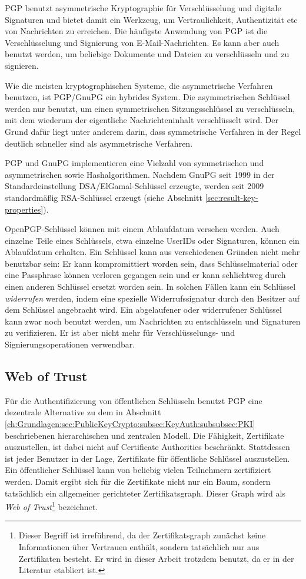 PGP benutzt asymmetrische Kryptographie für Verschlüsselung und
digitale Signaturen und bietet damit ein Werkzeug, um Vertraulichkeit,
Authentizität etc von Nachrichten zu erreichen. Die häufigste
Anwendung von PGP ist die Verschlüsselung und Signierung von
E-Mail-Nachrichten. Es kann aber auch benutzt werden, um beliebige
Dokumente und Dateien zu verschlüsseln und zu signieren.

Wie die meisten kryptographischen Systeme, die asymmetrische Verfahren
benutzen, ist PGP/GnuPG ein hybrides System. Die asymmetrischen
Schlüssel werden nur benutzt, um einen symmetrischen
Sitzungsschlüssel zu verschlüsseln, mit dem wiederum der
eigentliche Nachrichteninhalt verschlüsselt wird. Der Grund dafür
liegt unter anderem darin, dass symmetrische Verfahren in der Regel
deutlich schneller sind als asymmetrische Verfahren.

PGP und GnuPG implementieren eine Vielzahl von symmetrischen und
asymmetrischen sowie Hashalgorithmen. Nachdem GnuPG seit 1999 in der
Standardeinstellung DSA/ElGamal-Schlüssel erzeugte, werden seit 2009
standardmäßig RSA-Schlüssel erzeugt (siehe Abschnitt
\ref{sec:result-key-properties}).

OpenPGP-Schlüssel können mit einem Ablaufdatum versehen
werden. Auch einzelne Teile eines Schlüssels, etwa einzelne UserIDs
oder Signaturen, können ein Ablaufdatum erhalten. Ein Schlüssel
kann aus verschiedenen Gründen nicht mehr benutzbar sein: Er kann
kompromittiert worden sein, dass Schlüsselmaterial oder eine
Passphrase können verloren gegangen sein und er kann schlichtweg
durch einen anderen Schlüssel ersetzt worden sein. In solchen
Fällen kann ein Schlüssel \emph{widerrufen} werden, indem eine
spezielle Widerrufssignatur durch den Besitzer auf dem Schlüssel
angebracht wird. Ein abgelaufener oder widerrufener Schlüssel kann
zwar noch benutzt werden, um Nachrichten zu entschlüsseln und
Signaturen zu verifizieren. Er ist aber nicht mehr für
Verschlüsselungs- und Signierungsoperationen verwendbar.

\subsection{Web of Trust}
\label{ch:Grundlagen:sec:PublicKeyCrypto:subsec:KeyAuth:subsubsec:WOT}

Für die Authentifizierung von öffentlichen Schlüsseln benutzt
PGP eine dezentrale Alternative zu dem in Abschnitt
\ref{ch:Grundlagen:sec:PublicKeyCrypto:subsec:KeyAuth:subsubsec:PKI}
beschriebenen hierarchischen und zentralen
Modell\cite{Ashley1999}. Die Fähigkeit, Zertifikate auszustellen,
ist dabei nicht auf Certificate Authorities beschränkt. Stattdessen
ist jeder Benutzer in der Lage, Zertifikate für öffentliche
Schlüssel auszustellen. Ein öffentlicher Schlüssel kann von
beliebig vielen Teilnehmern zertifiziert werden. Damit ergibt sich
für die Zertifikate nicht nur ein Baum, sondern tatsächlich ein
allgemeiner gerichteter Zertifikatsgraph. Dieser Graph wird als
\emph{Web of Trust}\footnote{Dieser Begriff ist irreführend, da der
  Zertifikatsgraph zunächst keine Informationen über Vertrauen
  enthält, sondern tatsächlich nur aus Zertifikaten besteht. Er
  wird in dieser Arbeit trotzdem benutzt, da er in der Literatur
  etabliert ist.} bezeichnet.

